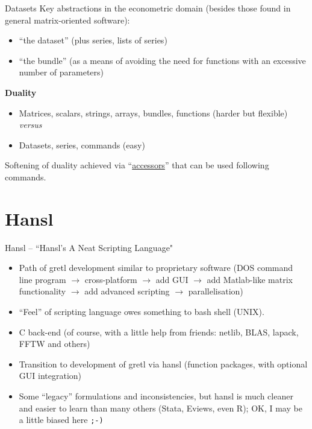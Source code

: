 \documentclass{beamer}[11pt]
\begin{document}
\begin{frame}{Datasets}
	  Key abstractions in the econometric domain (besides those found in
	  general matrix-oriented software):
	  \begin{itemize}
	  	\item ``the dataset'' (plus series, lists of series)
	  	\item ``the bundle'' (as a means of avoiding the need for functions
	  	with an excessive number of parameters)
	  \end{itemize}
	  
	  
	  \textbf{Duality}
	  \begin{itemize}
	  	\item Matrices, scalars, strings, arrays, bundles, functions (harder but flexible) \emph{versus}
	  	\item Datasets, series, commands (easy)
	  \end{itemize}
	  
	  \vspace{0.5cm}
	  
	  Softening of duality achieved via ``\underline{accessors}'' that can be used following commands. %
	
\end{frame}

\section{Hansl}

\begin{frame}{Hansl -- “Hansl’s A Neat Scripting Language"}
	
	\begin{itemize}
		\item Path of gretl development similar to proprietary software (DOS
		command line program $\to$ cross-platform $\to$ add GUI $\to$ add
		Matlab-like matrix functionality $\to$ add advanced scripting $ \to $ parallelisation) %
		\item ``Feel'' of scripting language owes something to bash shell (UNIX).
		\item C back-end (of course, with a little help from friends:
		netlib, BLAS, lapack, FFTW and others) %
		\item Transition to development of gretl via hansl (function
		packages, with optional GUI integration) %
		\item Some ``legacy'' formulations and inconsistencies, but hansl is much cleaner and easier to learn than many others (Stata, Eviews, even R); OK, I may be a little biased here \texttt{;-)}
	\end{itemize}
\end{frame}
\end{document}
